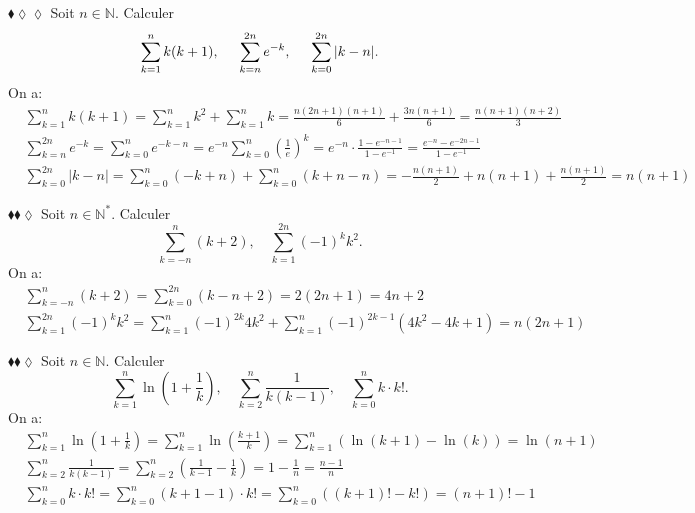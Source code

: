 \documentclass[11pt]{article}
\begin{document}
\begin{exercice}{$\blacklozenge\lozenge\lozenge$}{}
    Soit $n\in\mathbb{N}$. Calculer
    \begin{equation*}
        \sum\limits^{n}_{k=1}{k(k+1)}, \hspace{0.5cm} \sum\limits^{2n}_{k=n}{e^{-k}}, \hspace{0.5cm} \sum\limits^{2n}_{k=0}{|k-n|}.
    \end{equation*}
    \tcblower
    On a:
    \begin{align*}
        &\sum\limits^n_{k=1}{k(k+1)} = \sum\limits^n_{k=1}{k^2} + \sum\limits^n_{k=1}{k} = \frac{n(2n+1)(n+1)}{6}+\frac{3n(n+1)}{6}=\frac{n(n+1)(n + 2)}{3}\\
        &\sum\limits^{2n}_{k=n}{e^{-k}} = \sum\limits^{n}_{k=0}{e^{-k-n}}=e^{-n}\sum\limits^{n}_{k=0}{(\frac{1}{e})^k}=e^{-n}\cdot\frac{1-e^{-n-1}}{1-e^{-1}}=\frac{e^{-n}-e^{-2n-1}}{1-e^{-1}}\\
        &\sum\limits^{2n}_{k=0}{|k-n|}=\sum\limits^{n}_{k=0}{(-k+n)}+\sum\limits^{n}_{k=0}{(k+n-n)}=-\frac{n(n+1)}{2}+n(n+1)+\frac{n(n+1)}{2}=n(n+1)
    \end{align*}
\end{exercice}

\begin{exercice}{$\blacklozenge\blacklozenge\lozenge$}{}
    Soit $n\in\mathbb{N}^*$. Calculer
    \begin{equation*}
        \sum\limits^{n}_{k=-n}{(k+2)}, \quad \sum\limits^{2n}_{k=1}{(-1)^kk^2}.
    \end{equation*}
    \tcblower
    On a:
    \begin{align*}
        &\sum\limits^{n}_{k=-n}{(k+2)}=\sum\limits^{2n}_{k=0}{(k-n+2)}=2(2n+1)=4n+2\\
        &\sum\limits^{2n}_{k=1}{(-1)^kk^2}=\sum\limits^{n}_{k=1}{(-1)^{2k}4k^2}+\sum\limits^{n}_{k=1}{(-1)^{2k-1}(4k^2-4k+1)}=n(2n+1)
    \end{align*}
\end{exercice}

\begin{exercice}{$\blacklozenge\blacklozenge\lozenge$}{}
    Soit $n\in\mathbb{N}$. Calculer
    \begin{equation*}
        \sum\limits^{n}_{k=1}{\ln(1+\frac{1}{k})}, \quad \sum\limits^{n}_{k=2}{\frac{1}{k(k-1)}}, \quad \sum\limits_{k=0}^{n}{k\cdot k!}.
    \end{equation*}
    \tcblower
    On a:
    \begin{align*}
        &\sum\limits^{n}_{k=1}{\ln(1+\frac{1}{k})}=\sum\limits^n_{k=1}{\ln(\frac{k+1}{k})}=\sum\limits^n_{k=1}{(\ln(k+1)-\ln(k))}=\ln(n+1)\\
        &\sum\limits^{n}_{k=2}{\frac{1}{k(k-1)}}=\sum\limits^n_{k=2}{(\frac{1}{k-1}-\frac{1}{k})}=1-\frac{1}{n}=\frac{n-1}{n}\\
        &\sum\limits_{k=0}^{n}{k\cdot k!}=\sum\limits^n_{k=0}{(k+1-1)\cdot k!}=\sum\limits^n_{k=0}{((k+1)! - k!)}=(n+1)!-1
    \end{align*}
\end{exercice}
\end{document}
